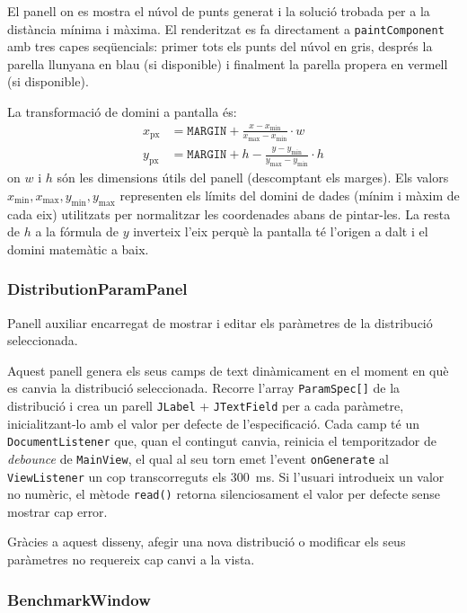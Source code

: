 \documentclass[conference,compsoc]{IEEEtran}
\begin{document}
El panell on es mostra el núvol de punts generat i la solució trobada
per a la distància mínima i màxima.
El renderitzat es fa directament a \texttt{paintComponent} amb tres
capes seqüencials: primer tots els punts del núvol en gris, després la
parella llunyana en blau (si disponible) i finalment la parella propera
en vermell (si disponible).

La transformació de domini a pantalla és:
\begin{align}
x_{\text{px}} &= \texttt{MARGIN} + \frac{x - x_{\min}}{x_{\max} - x_{\min}} \cdot w \\
y_{\text{px}} &= \texttt{MARGIN} + h - \frac{y - y_{\min}}{y_{\max} - y_{\min}} \cdot h
\end{align}
on $w$ i $h$ són les dimensions útils del panell (descomptant els marges).
Els valors $x_{\min}, x_{\max}, y_{\min}, y_{\max}$ representen els límits
del domini de dades (mínim i màxim de cada eix) utilitzats per normalitzar
les coordenades abans de pintar-les.
La resta de $h$ a la fórmula de $y$ inverteix l'eix perquè la
pantalla té l'origen a dalt i el domini matemàtic a baix.

\subsubsection{DistributionParamPanel}

Panell auxiliar encarregat de mostrar i editar els paràmetres de la
distribució seleccionada.

Aquest panell genera els seus camps de text dinàmicament en el moment
en què es canvia la distribució seleccionada. Recorre l'array
\texttt{ParamSpec[]} de la distribució i crea un parell \texttt{JLabel}
+ \texttt{JTextField} per a cada paràmetre, inicialitzant-lo amb el valor
per defecte de l'especificació. Cada camp té un \texttt{DocumentListener} que, quan el contingut canvia,
reinicia el temporitzador de \textit{debounce} de \texttt{MainView}, el qual
al seu torn emet l'event \texttt{onGenerate} al \texttt{ViewListener}
un cop transcorreguts els 300~ms. Si l'usuari introdueix un valor no
numèric, el mètode \texttt{read()} retorna silenciosament el valor per
defecte sense mostrar cap error.

Gràcies a aquest disseny, afegir una nova distribució o modificar els
seus paràmetres no requereix cap canvi a la vista.

\subsubsection{BenchmarkWindow}
\end{document}
